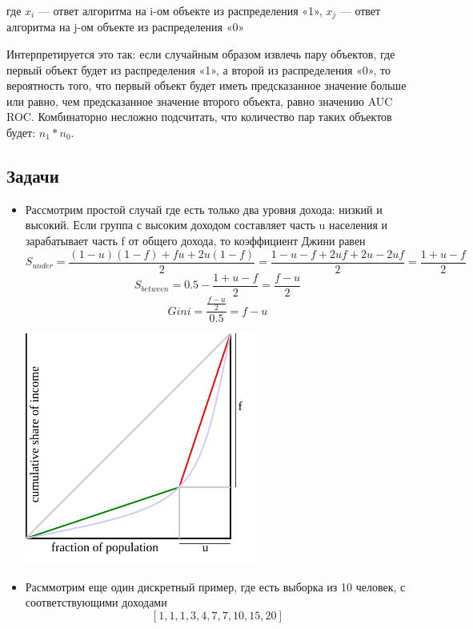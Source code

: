 \documentclass{article}
\begin{document}
где $x_i$ — ответ алгоритма на i-ом объекте из распределения «1», $x_j$ — ответ алгоритма на j-ом объекте из распределения «0»

Интерпретируется это так: если случайным образом извлечь пару объектов, где первый объект будет из распределения «1», а второй из распределения «0», то вероятность того, что первый объект будет иметь предсказанное значение больше или равно, чем предсказанное значение второго объекта, равно значению AUC ROC. Комбинаторно несложно подсчитать, что количество пар таких объектов будет: $n_1*n_0$.


\subsection*{Задачи}

\begin{itemize}
    \item Рассмотрим простой случай где есть только два уровня дохода: низкий и высокий. Если группа с высоким доходом составляет часть u населения и зарабатывает часть f от общего дохода, то коэффициент Джини равен 
    $$S_{under} = \frac{(1-u)(1-f) + fu + 2u(1 - f)}{2} = \frac{1 - u - f + 2uf + 2u -2uf}{2} = \frac{1 + u - f}{2}$$
    $$S_{between} = 0.5 - \frac{1 + u - f}{2} = \frac{f - u}{2}$$
    $$Gini = \frac{\frac{f - u}{2}}{0.5} = f - u$$
    
    \begin{center}
        \includegraphics[width=0.6\textwidth]{pics/prim.png}
    \end{center} 

    \item Расммотрим еще один дискретный пример, где есть выборка из 10 человек, с соответствующими доходами $$[1, 1, 1, 3, 4, 7, 7, 10, 15, 20]$$


\end{itemize}
\end{document}
